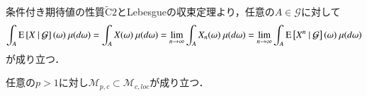 	\begin{prf}
		条件付き期待値の性質$\tilde{\mathrm{C}}2$とLebesgueの収束定理より，任意の$A \in \mathcal{G}$に対して
		\begin{align}
			\int_A \operatorname{E} \left[ X \ \middle|\ \mathcal{G} \right](\omega)\ \mu(d\omega)
			= \int_A X(\omega)\ \mu(d\omega) = \lim_{n \to \infty} \int_A X_n(\omega)\ \mu(d\omega)
			= \lim_{n \to \infty} \int_A \operatorname{E} \left[ X^n \ \middle|\ \mathcal{G} \right](\omega)\ \mu(d\omega)
		\end{align}
		が成り立つ．
		\QED
	\end{prf}
	
	\begin{itembox}[l]{}
		\begin{prp}
			任意の$p > 1$に対し$\mathcal{M}_{p,c} \subset \mathcal{M}_{c,loc}$が成り立つ．
		\end{prp}
	\end{itembox}
	
	\begin{prf}
		
	\end{prf}